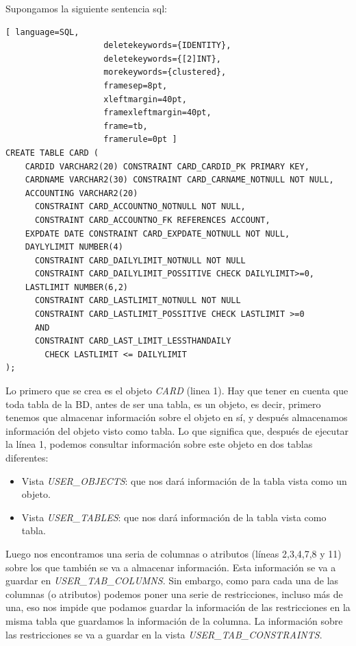 \begin{example}
Supongamos la siguiente sentencia sql:
\begin{lstlisting}[ language=SQL,
                    deletekeywords={IDENTITY},
                    deletekeywords={[2]INT},
                    morekeywords={clustered},
                    framesep=8pt,
                    xleftmargin=40pt,
                    framexleftmargin=40pt,
                    frame=tb,
                    framerule=0pt ]
CREATE TABLE CARD (
    CARDID VARCHAR2(20) CONSTRAINT CARD_CARDID_PK PRIMARY KEY,
    CARDNAME VARCHAR2(30) CONSTRAINT CARD_CARNAME_NOTNULL NOT NULL,
    ACCOUNTING VARCHAR2(20)
      CONSTRAINT CARD_ACCOUNTNO_NOTNULL NOT NULL,
      CONSTRAINT CARD_ACCOUNTNO_FK REFERENCES ACCOUNT,
	EXPDATE DATE CONSTRAINT CARD_EXPDATE_NOTNULL NOT NULL,
	DAYLYLIMIT NUMBER(4)
	  CONSTRAINT CARD_DAILYLIMIT_NOTNULL NOT NULL
	  CONSTRAINT CARD_DAILYLIMIT_POSSITIVE CHECK DAILYLIMIT>=0,
	LASTLIMIT NUMBER(6,2)
	  CONSTRAINT CARD_LASTLIMIT_NOTNULL NOT NULL
	  CONSTRAINT CARD_LASTLIMIT_POSSITIVE CHECK LASTLIMIT >=0
	  AND
	  CONSTRAINT CARD_LAST_LIMIT_LESSTHANDAILY
	    CHECK LASTLIMIT <= DAILYLIMIT
);
\end{lstlisting}

Lo primero que se crea es el objeto \textit{CARD} (linea 1). Hay que tener en cuenta que toda tabla de la BD, antes de ser una tabla, es un objeto, es decir, primero tenemos que almacenar información sobre el objeto en sí, y después almacenamos información del objeto visto como tabla. Lo que significa que, después de ejecutar la línea 1, podemos consultar información sobre este objeto en dos tablas diferentes:
\begin{itemize}
\item Vista \textit{USER\_OBJECTS}: que nos dará información de la tabla vista como un objeto.
\item Vista \textit{USER\_TABLES}: que nos dará información de la tabla vista como tabla. 
\end{itemize}
Luego nos encontramos una seria de columnas o atributos (líneas 2,3,4,7,8 y 11) sobre los que también se va a almacenar información. Esta información se va a 
guardar en \textit{USER\_TAB\_COLUMNS}. Sin embargo, como para cada una de las columnas (o atributos) podemos poner una serie de restricciones, incluso más de una, eso nos impide que podamos guardar la información de las restricciones en la misma tabla que guardamos la información de la columna. La información sobre las restricciones se va a guardar en la vista \textit{USER\_TAB\_CONSTRAINTS}.
\end{example}

